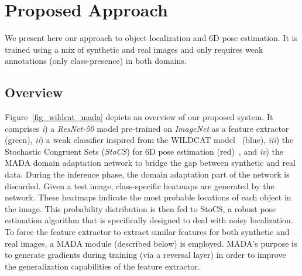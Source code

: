\documentclass[letterpaper, 10 pt, conference]{ieeeconf}  %
\newcommand{\phil}[1]{\textcolor{blue}{#1}}
\begin{document}
\section{Proposed Approach}\label{sec:approach}
We present here our approach to object localization and 6D pose estimation. It is trained using a mix of synthetic and real images and only requires weak annotations (only class-presence) in both domains.

\vspace{-0.55cm}\subsection{Overview}%

Figure~\ref{fig_wildcat_mada} depicts an overview of our proposed system. It comprises {\it i}) a {\it ResNet-50} model pre-trained on {\it ImageNet} as a feature extractor (green), {\it ii}) a weak classifier inspired from the WILDCAT model~\cite{durand2017wildcat} (blue), {\it iii}) the Stochastic Congruent Sets ({\it StoCS}) for 6D pose estimation (red)~\cite{mitash2018robust}, and {\it iv}) the MADA domain adaptation network to bridge the gap between synthetic and real data. %
During the inference phase, the domain adaptation part of the network is discarded. Given a test image, class-specific heatmaps are generated by the network. These heatmaps indicate the most probable locations of each object in the image. This probability distribution is then fed to StoCS, a robust pose estimation algorithm that is specifically designed to deal with noisy localization.
To force the feature extractor to extract similar features for both synthetic and real images, a MADA module (described below) is employed.
MADA's purpose is to generate gradients during training (via a reversal layer) in order to improve the generalization capabilities of the feature extractor.
\end{document}
